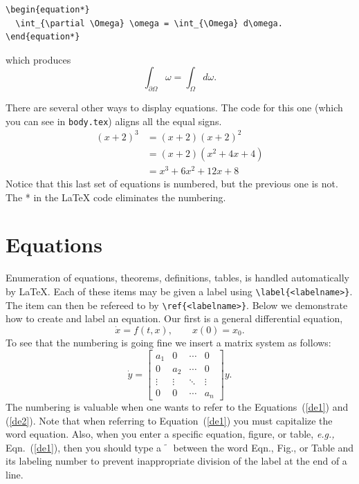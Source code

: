 \medskip\noindent\hspace*{2em}\begin{minipage}{4.5in}
\begin{verbatim}
\begin{equation*}
  \int_{\partial \Omega} \omega = \int_{\Omega} d\omega.
\end{equation*}
\end{verbatim}
\end{minipage}

\medskip\noindent
which produces
\begin{equation*}
  \int_{\partial \Omega} \omega = \int_{\Omega} d\omega.
\end{equation*}

There are several other ways to display equations.  The code for this
one (which you can see in \verb+body.tex+) aligns all the equal
signs.
\begin{align}
  (x+2)^3 & = (x+2)(x+2)^2 \\
  &= (x+2)(x^2+4x+ 4) \\
  &= x^3+ 6x^2 + 12x + 8
\end{align}
Notice that this last set of equations is numbered, but the previous
one is not.  The * in the \LaTeX{} code eliminates the numbering.


\section{Equations}

Enumeration of equations, theorems, definitions, tables, is handled
automatically by \LaTeX.  Each of these items may be given a label
using \verb+\label{<labelname>}+.  The item can then be refereed to
by \verb+\ref{<labelname>}+.  Below we demonstrate how
to create and label an equation. Our first is a general differential
equation,
\begin{equation}
  \dot{x} = f(t,x),\qquad x(0)= x_0. \label{de1}
\end{equation}
To see that the numbering is going fine we insert a matrix system as
follows:
\begin{equation}
  \dot{y} =
  \begin{bmatrix}
    a_1 & 0 & \cdots & 0 \\
    0 & a_2 & \cdots & 0 \\
    \vdots & \vdots & \ddots & \vdots \\
    0 & 0 & \cdots & a_n
  \end{bmatrix}
  y.
  \label{de2}
\end{equation}
The numbering is valuable when one wants to refer to the
Equations~(\ref{de1}) and (\ref{de2}). Note that when referring to
Equation~(\ref{de1}) you must capitalize the word equation. Also, when
you enter a specific equation, figure, or table, \emph{e.g.,}
Eqn.~(\ref{de1}), then you should type a $\tilde{\phantom{x}}$ between
the word Eqn., Fig., or Table and its labeling number to prevent
inappropriate division of the label at the end of a line.

